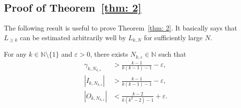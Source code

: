 \documentclass{ws-ijnt}
\begin{document}
	\subsection{Proof of Theorem~\ref{thm: 2}}
	The following result is useful to prove Theorem~\ref{thm: 2}. It basically says that $L_{\geq k}$ can be estimated arbitrarily well by $L_{k,N}$ for sufficiently large $N$. 
	\begin{proposition}\label{prop: Luroth Cusick--Lee Type Helper Improved}
		For any $k\in\mathbb{N}\setminus\{1\}$ and $\varepsilon>0$, there exists $N_{k,\varepsilon}\in\mathbb{N}$ such that
		\begin{align*}
			\gamma_{k,N_{k,\varepsilon}}
			&>\frac{k-1}{k(k-1)-1}-\varepsilon, \\
			\left\lvert{I_{k,N_{k,\varepsilon}}}\right\rvert
			&>\frac{k-1}{k(k-1)-1}-\varepsilon, \\
			\left\lvert{O_{k,N_{k,\varepsilon}}}\right\rvert
			&<\frac{k-2}{k(k^2-2)-1}+\varepsilon
			.
		\end{align*}
	\end{proposition}
\end{document}
